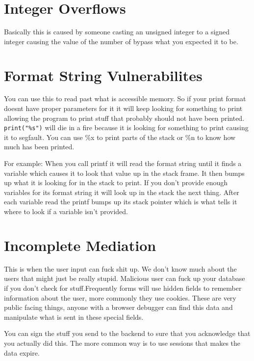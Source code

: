 \documentclass{article}
\begin{document}
\section{Integer Overflows} %
\label{sec:integer_overflows}
Basically this is caused by someone casting an unsigned integer to a signed integer causing the value of the number of bypass what you expected it to be.


\section{Format String Vulnerabilites} %
\label{sec:format_string_vulnerabilites}
You can use this to read past what is accessible memory. So if your print format doesnt have proper parameters for it it will keep looking for something to print allowing the program to print stuff that probably should not have been printed. \texttt{print("\%s")} will die in a fire because it is looking for something to print causing it to segfault. You can use \%x to print parts of the stack or \%n to know how much has been printed. 

For example: When you call printf it will read the format string until it finds a variable which causes it to look that value up in the stack frame. It then bumps up what it is looking for in the stack to print. If you don't provide enough variables for its format string it will look up in the stack the next thing. After each variable read the printf bumps up its stack pointer which is what tells it where to look if a variable isn't provided. 


\section{Incomplete Mediation} %
\label{sec:incomplete_mediation}
This is when the user input can fuck shit up. We don't know much about the users that might just be really stupid. Malicious user can fuck up your database if you don't check for stuff.Frequently forms will use hidden fields to remember information about the user, more commonly they use cookies. These are very public facing things, anyone with a browser debugger can find this data and manipulate what is sent in these special fields.

You can sign the stuff you send to the backend to sure that you acknowledge that you actually did this. The more common way is to use sessions that makes the data expire.
\end{document}
